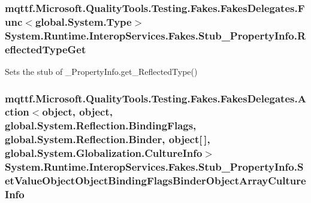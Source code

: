 \hypertarget{class_system_1_1_runtime_1_1_interop_services_1_1_fakes_1_1_stub___property_info_a2f4a212b28b724e27dd6c6e5a98978f7}{
\subsubsection[{Reflected\-Type\-Get}]{\setlength{\rightskip}{0pt plus 5cm}mqttf.\-Microsoft.\-Quality\-Tools.\-Testing.\-Fakes.\-Fakes\-Delegates.\-Func$<$global.\-System.\-Type$>$ System.\-Runtime.\-Interop\-Services.\-Fakes.\-Stub\-\_\-\-Property\-Info.\-Reflected\-Type\-Get}}\label{class_system_1_1_runtime_1_1_interop_services_1_1_fakes_1_1_stub___property_info_a2f4a212b28b724e27dd6c6e5a98978f7}


Sets the stub of \-\_\-\-Property\-Info.\-get\-\_\-\-Reflected\-Type()

\hypertarget{class_system_1_1_runtime_1_1_interop_services_1_1_fakes_1_1_stub___property_info_a7695ee33506a7ca794999ef8f3371ae4}{
\subsubsection[{Set\-Value\-Object\-Object\-Binding\-Flags\-Binder\-Object\-Array\-Culture\-Info}]{\setlength{\rightskip}{0pt plus 5cm}mqttf.\-Microsoft.\-Quality\-Tools.\-Testing.\-Fakes.\-Fakes\-Delegates.\-Action$<$object, object, global.\-System.\-Reflection.\-Binding\-Flags, global.\-System.\-Reflection.\-Binder, object\mbox{[}$\,$\mbox{]}, global.\-System.\-Globalization.\-Culture\-Info$>$ System.\-Runtime.\-Interop\-Services.\-Fakes.\-Stub\-\_\-\-Property\-Info.\-Set\-Value\-Object\-Object\-Binding\-Flags\-Binder\-Object\-Array\-Culture\-Info}}\label{class_system_1_1_runtime_1_1_interop_services_1_1_fakes_1_1_stub___property_info_a7695ee33506a7ca794999ef8f3371ae4}


